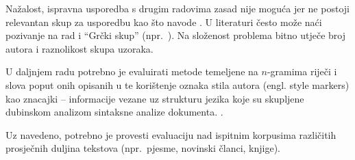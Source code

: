 \documentclass{article}
\begin{document}
Nažalost, ispravna usporedba s drugim radovima zasad nije moguća jer ne postoji
relevantan skup za usporedbu kao što navode \citep{zhao2005effective}. U
literaturi često može naći pozivanje na rad
\citep{stamatatos2001computer,stamatatos1999automatic} i ``Grčki skup''
(npr.~\citep{keselj2003n}). Na složenost problema bitno utječe broj autora i
raznolikost skupa uzoraka.

U daljnjem radu potrebno je evaluirati metode temeljene na $n$-gramima riječi i
slova poput onih opisanih u
\citep{keselj2003n,peng2003language,coyotl2006authorship} te korištenje oznaka
stila autora (engl. style markers) kao znacajki – informacije vezane uz strukturu
jezika koje su skupljene dubinskom analizom sintaksne analize dokumenta.
\citep{stamatatos2001computer,diri2003automatic,luyckx2005shallow}.

Uz navedeno, potrebno je provesti evaluaciju nad ispitnim korpusima različitih
prosječnih duljina tekstova (npr.~pjesme, novinski članci, knjige).

\newpage




\newpage

\appendix
\end{document}
